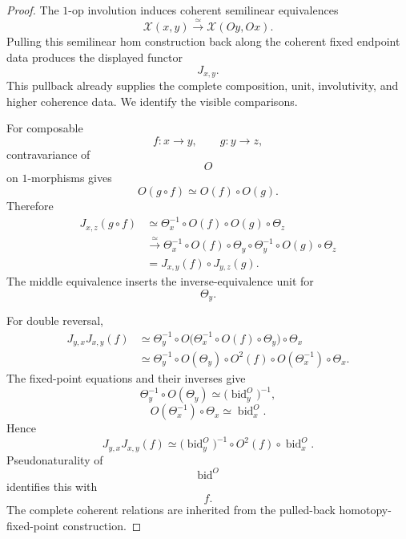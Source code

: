 \begin{proof}
The $1$-op involution induces coherent semilinear equivalences
\[
    \mathcal X(x,y)
    \xrightarrow{\;\simeq\;}
    \mathcal X(Oy,Ox).
\]
Pulling this semilinear hom construction back along the coherent fixed
endpoint data produces the displayed functor
\[
    J_{x,y}.
\]
This pullback already supplies the complete composition, unit,
involutivity, and higher coherence data. We identify the visible
comparisons.

For composable
\[
    f
    \colon
    x
    \longrightarrow
    y,
    \qquad
    g
    \colon
    y
    \longrightarrow
    z,
\]
contravariance of
\[
    O
\]
on $1$-morphisms gives
\[
    O(g\circ f)
    \simeq
    O(f)\circ O(g).
\]
Therefore
\[
\begin{aligned}
    J_{x,z}(g\circ f)
    &\simeq
    \Theta_x^{-1}
    \circ
    O(f)
    \circ
    O(g)
    \circ
    \Theta_z
    \\
    &\xrightarrow{\;\simeq\;}
    \Theta_x^{-1}
    \circ
    O(f)
    \circ
    \Theta_y
    \circ
    \Theta_y^{-1}
    \circ
    O(g)
    \circ
    \Theta_z
    \\
    &=
    J_{x,y}(f)
    \circ
    J_{y,z}(g).
\end{aligned}
\]
The middle equivalence inserts the inverse-equivalence unit for
\[
    \Theta_y.
\]

For double reversal,
\[
\begin{aligned}
    J_{y,x}J_{x,y}(f)
    &\simeq
    \Theta_y^{-1}
    \circ
    O
    \bigl(
        \Theta_x^{-1}
        \circ
        O(f)
        \circ
        \Theta_y
    \bigr)
    \circ
    \Theta_x
    \\
    &\simeq
    \Theta_y^{-1}
    \circ
    O(\Theta_y)
    \circ
    O^2(f)
    \circ
    O(\Theta_x^{-1})
    \circ
    \Theta_x.
\end{aligned}
\]
The fixed-point equations and their inverses give
\[
    \Theta_y^{-1}\circ O(\Theta_y)
    \simeq
    \bigl(
        \operatorname{bid}^{O}_y
    \bigr)^{-1},
\]
\[
    O(\Theta_x^{-1})\circ\Theta_x
    \simeq
    \operatorname{bid}^{O}_x.
\]
Hence
\[
    J_{y,x}J_{x,y}(f)
    \simeq
    \bigl(
        \operatorname{bid}^{O}_y
    \bigr)^{-1}
    \circ
    O^2(f)
    \circ
    \operatorname{bid}^{O}_x.
\]
Pseudonaturality of
\[
    \operatorname{bid}^{O}
\]
identifies this with
\[
    f.
\]
The complete coherent relations are inherited from the pulled-back
homotopy-fixed-point construction.
\end{proof}

